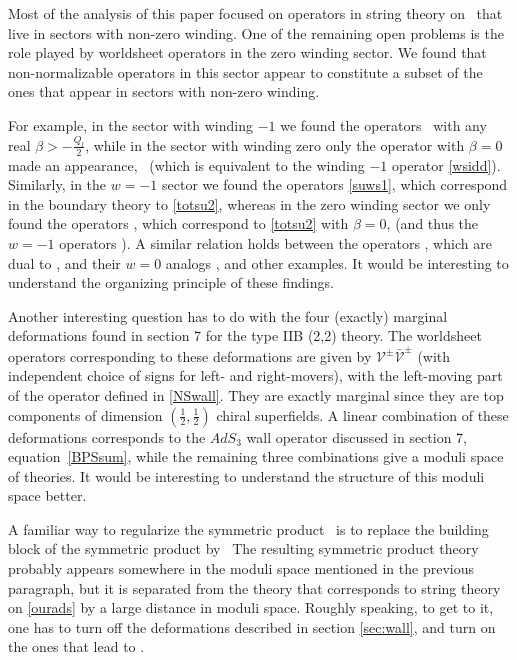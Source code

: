 \documentclass[12pt]{article}
\def\sltwo{\ensuremath{SL(2,\bR)}}
\def\sutwo{{SU(2)}}
\def\uone{U(1)}
\def\half{\frac12}
\def\coeff#1#2{{\textstyle \frac{#1}{#2}}}
\def\hf{\coeff12}
\newcommand{\bR}{{\mathbb R}}
\newcommand{\bZ}{{\mathbb Z}}
\numberwithin{equation}{section}
\def\cV{\mathcal {V}} \def\cW{\mathcal {W}} \def\cX{\mathcal {X}}
\def\coeff#1#2{{\textstyle{\frac{#1}{ #2}}}}
\def\half{\frac12}
\def\hf{{\textstyle\half}}
\begin{document}
Most of the analysis of this paper focused on operators in string theory on \ourads\ that live in sectors with non-zero winding. One of the remaining open problems is the role played by worldsheet operators in the zero winding sector. We found that non-normalizable operators in this sector appear to constitute a subset of the ones that appear in sectors with non-zero winding. 

For example, in the sector with winding $-1$ we found the operators \ebphiws\ with any real $\beta>-\frac{Q_l}2$, while in the sector with winding zero only the operator with $\beta=0$ made an appearance, \Ioperator\ (which is equivalent to the winding $-1$ operator \eqref{wsidd}). Similarly, in the $w=-1$ sector we found the operators \eqref{suws1}, which correspond in the boundary theory to \eqref{totsu2}, whereas in the zero winding sector we only found the operators \Kst, which correspond to \eqref{totsu2} with $\beta=0$, (and thus the $w=-1$ operators \dualcurr). A similar relation holds between the operators \WFZZgenj, which are dual to \Wblockop, and their $w=0$ analogs \WXtypeII, and other examples. It would be interesting to understand the organizing principle of these findings.

Another interesting question has to do with the four (exactly) marginal deformations found in section 7 for the type IIB (2,2) theory. The worldsheet operators corresponding to these deformations are given by $\cV^\pm\bar{\cV}^\pm$ (with independent choice of signs for left- and right-movers), with the left-moving part of the operator defined in \eqref{NSwall}. They are exactly marginal since they are top components of dimension $(\hf,\hf)$ chiral superfields. A linear combination of these deformations corresponds to the $AdS_3$ wall operator discussed in section 7, equation~\eqref{BPSsum}, while the remaining three combinations give a moduli space of theories. It would be interesting to understand the structure of this moduli space better. 

A familiar way to regularize the symmetric product \ourcft\ is to replace the building block of the symmetric product by~
\eqn[blockwall]{
\bR_\phi\times\sutwo_n^\flat
~~\longrightarrow~~
\bigg(\frac{\sltwo_{k_\ell}\times\sutwo_n^\flat}{\uone_L\times\uone_R}\bigg)
=\bigg(\frac{\sltwo_{n(n+1)}}{U(1)\times \bZ_{n+1}}\times\frac{SU(2)_n}{U(1)}\bigg)/\bZ_n ~.
}
The resulting symmetric product theory probably appears somewhere in the moduli space mentioned in the previous paragraph, but it is separated from the theory that corresponds to string theory on \eqref{ourads} by a large distance in moduli space. Roughly speaking, to get to it, one has to turn off the deformations described in section \ref{sec:wall}, and turn on the ones that lead to \blockwall. 
\end{document}
